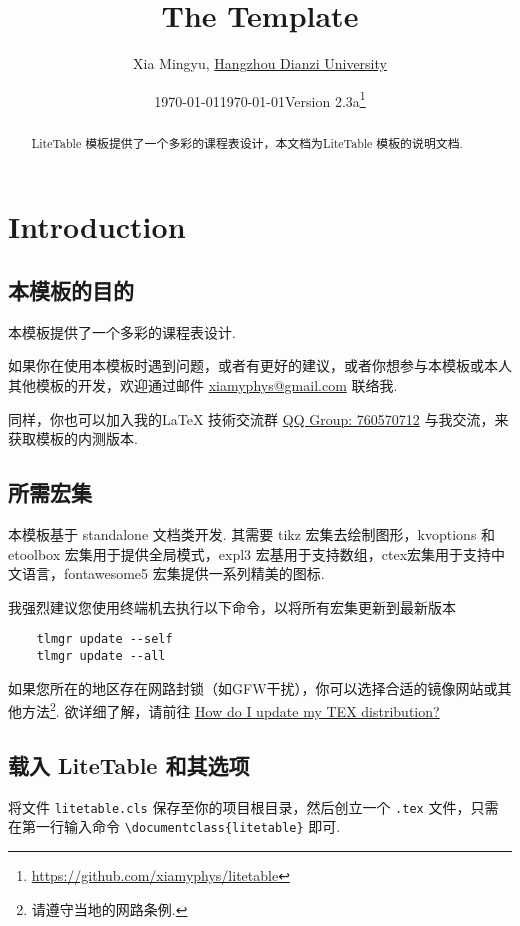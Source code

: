 \documentclass[11pt]{article}
\title{The \pkg{LiteTable} Template}
\author[1]{Xia Mingyu, \href{https://www.hdu.edu.cn}{Hangzhou Dianzi University}}
\date{\today}
\affil[1]{\href{mailto:xiamyphys@gmail.com}{\texttt{xiamyphys@gmail.com}}}
\date{\today\quad Version 2.3a\thanks{%
  \url{https://github.com/xiamyphys/litetable}}}
\def\pkg#1{\texorpdfstring{\textcolor{pkgcolor}{\textsf{#1}}}{“#1”}}
\begin{document}
\maketitle

\vspace{-2em}
\begin{abstract}
\pkg{LiteTable} 模板提供了一个多彩的课程表设计，本文档为\pkg{LiteTable} 模板的说明文档.

\end{abstract}

\tableofcontents\clearpage

\section{Introduction}

\subsection{本模板的目的}
本模板提供了一个多彩的课程表设计. 

如果你在使用本模板时遇到问题，或者有更好的建议，或者你想参与本模板或本人其他模板的开发，欢迎通过邮件 \href{mailto:xiamyphys@gmail.com}{xiamyphys@gmail.com} 联络我.

同样，你也可以加入我的\textsf\LaTeX{} 技術交流群 \href{https://qm.qq.com/q/OnHzbNvVAG}{QQ Group: 760570712} 与我交流，来获取模板的内测版本.

\subsection{所需宏集}
本模板基于 \pkg{standalone} 文档类开发. 其需要 \pkg{tikz} 宏集去绘制图形，\pkg{kvoptions} 和 \pkg{etoolbox} 宏集用于提供全局模式，\pkg{expl3} 宏基用于支持数组，\pkg{ctex}宏集用于支持中文语言，\pkg{fontawesome5} 宏集提供一系列精美的图标.

我强烈建议您使用终端机去执行以下命令，以将所有宏集更新到最新版本
\begin{verbatim}
    tlmgr update --self
    tlmgr update --all
\end{verbatim}

如果您所在的地区存在网路封锁（如GFW干扰），你可以选择合适的镜像网站或其他方法\footnote{请遵守当地的网路条例.}. 欲详细了解，请前往 \href{https://tex.stackexchange.com/questions/55437/how-do-i-update-my-tex-distribution}{How do I update my TEX distribution?}

\subsection{载入 \pkg{LiteTable} 和其选项}
将文件 \verb|litetable.cls| 保存至你的项目根目录，然后创立一个 \verb|.tex| 文件，只需在第一行输入命令 \verb|\documentclass{litetable}| 即可.
\end{document}
